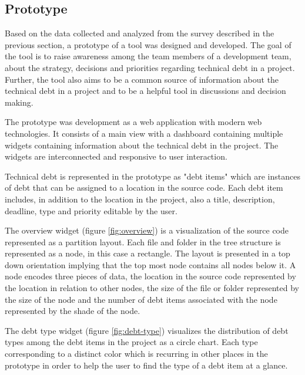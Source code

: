\subsection{Prototype}

Based on the data collected and analyzed from the survey described in the previous section, a prototype of a tool was designed and developed.
The goal of the tool is to raise awareness among the team members of a development team, about the strategy, decisions and priorities regarding technical debt in a project.
Further, the tool also aims to be a common source of information about the technical debt in a project and to be a helpful tool in discussions and decision making.

The prototype was development as a web application with modern web technologies.
It consists of a main view with a dashboard containing multiple widgets containing information about the technical debt in the project.
The widgets are interconnected and responsive to user interaction.

Technical debt is represented in the prototype as "debt items" which are instances of debt that can be assigned to a location in the source code. Each debt item includes, in addition to the location in the project, also a title, description, deadline, type and priority editable by the user.



The overview widget (figure \ref{fig:overview}) is a visualization of the source code represented as a partition layout.
Each file and folder in the tree structure is represented as a node, in this case a rectangle.
The layout is presented in a top down orientation implying that the top most node contains all nodes below it.
A node encodes three pieces of data, the location in the source code represented by the location in relation to other nodes, the size of the file or folder represented by the size of the node and the number of debt items associated with the node represented by the shade of the node.



The debt type widget (figure \ref{fig:debt-type}) visualizes the distribution of debt types among the debt items in the project as a circle chart.
Each type corresponding to a distinct color which is recurring in other places in the prototype in order to help the user to find the type of a debt item at a glance.



